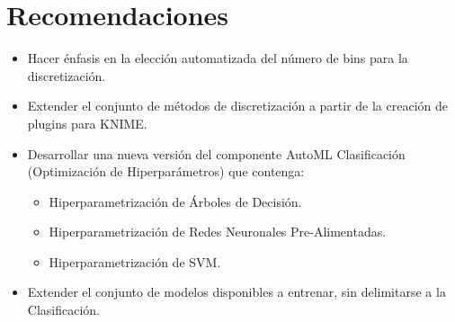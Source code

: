 \chapter*{Recomendaciones}
\begin{itemize}
	\item Hacer énfasis en la elección automatizada del número de bins para la discretización.
	\item Extender el conjunto de métodos de discretización a partir de la creación de plugins para KNIME.
	\item Desarrollar una nueva versión del componente AutoML Clasificación (Optimización de Hiperparámetros) que contenga:
	\begin{itemize}
		\item Hiperparametrización de Árboles de Decisión.
		\item Hiperparametrización de Redes Neuronales Pre-Alimentadas.
		\item Hiperparametrización de SVM.
	\end{itemize}
	\item Extender el conjunto de modelos disponibles a entrenar, sin delimitarse a la Clasificación.
\end{itemize}
